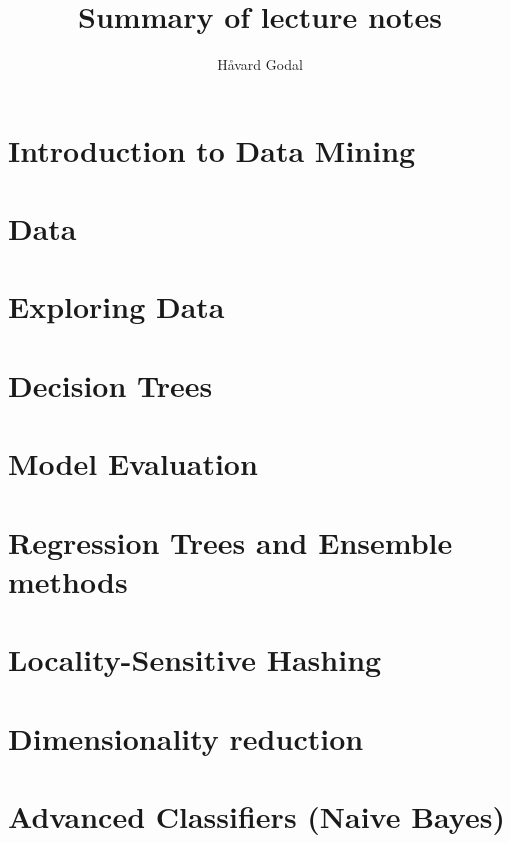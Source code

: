 \documentclass{notesclass}
\begin{document}
\begin{titlepage}
    \title{Summary of lecture notes}
    \author{Håvard Godal}
    \maketitle
\end{titlepage}

{
  \hypersetup{linkcolor=black}
  \tableofcontents
}


\chapter{Introduction to Data Mining}


\chapter{Data}


\chapter{Exploring Data}


\chapter{Decision Trees}


\chapter{Model Evaluation}


\chapter{Regression Trees and Ensemble methods}


\chapter{Locality-Sensitive Hashing}


\chapter{Dimensionality reduction}


\chapter{Advanced Classifiers (Naive Bayes)}


% 
\end{document}
